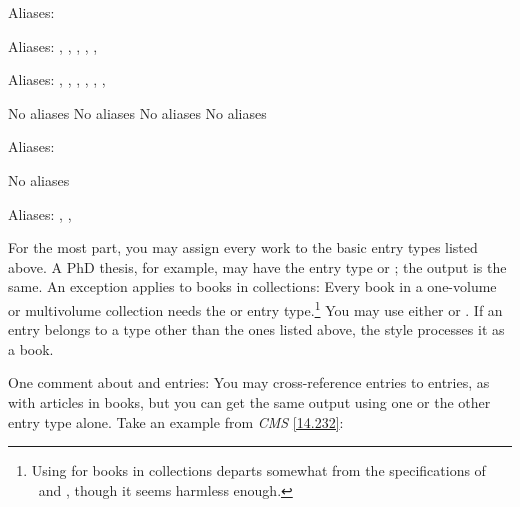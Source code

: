 \documentclass[11pt,letterpaper,oneside]{article}
\begin{document}
\begin{typelist}
\RaggedRight


Aliases: 


Aliases: , , ,
, , 


Aliases: , ,
, , ,
, 

 No aliases
 No aliases
 No aliases
 No aliases


Aliases: 

 No aliases


Aliases: , ,

\end{typelist}

\noindent For the most part, you may assign every work to the basic
entry types listed above. A PhD thesis, for example, may have the
entry type  or ; the output is the
same. An exception applies to books in collections: Every book in a
one-volume or multivolume collection needs the  or
 entry type.\footnote{Using  for
books in collections departs somewhat from the specifications of
\BibTeX\ and \biblatex, though it seems harmless enough.} You may use
either  or . If an entry belongs
to a type other than the ones listed above, the style processes it as
a book.

One comment about  and 
entries: You may cross-reference  entries to
 entries, as with articles in books, but you can
get the same output using one or the other entry type alone. Take an
example from \textit{CMS} \ref{14.232}:

\begin{citeonly}
\item \cite{salvation1980}
\end{citeonly}
\end{document}
